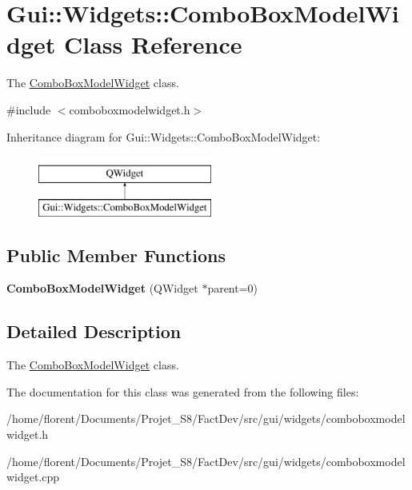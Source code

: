 \hypertarget{classGui_1_1Widgets_1_1ComboBoxModelWidget}{\section{Gui\-:\-:Widgets\-:\-:Combo\-Box\-Model\-Widget Class Reference}
\label{classGui_1_1Widgets_1_1ComboBoxModelWidget}
}


The \hyperlink{classGui_1_1Widgets_1_1ComboBoxModelWidget}{Combo\-Box\-Model\-Widget} class.  




{\ttfamily \#include $<$comboboxmodelwidget.\-h$>$}

Inheritance diagram for Gui\-:\-:Widgets\-:\-:Combo\-Box\-Model\-Widget\-:\begin{figure}[H]
\begin{center}
\leavevmode
\includegraphics[height=2.000000cm]{d2/de0/classGui_1_1Widgets_1_1ComboBoxModelWidget}
\end{center}
\end{figure}
\subsection*{Public Member Functions}
\begin{DoxyCompactItemize}
\item 
\hypertarget{classGui_1_1Widgets_1_1ComboBoxModelWidget_afeca0199adce7d17dc440e8fa546c9e5}{{\bfseries Combo\-Box\-Model\-Widget} (Q\-Widget $\ast$parent=0)}\label{classGui_1_1Widgets_1_1ComboBoxModelWidget_afeca0199adce7d17dc440e8fa546c9e5}

\end{DoxyCompactItemize}


\subsection{Detailed Description}
The \hyperlink{classGui_1_1Widgets_1_1ComboBoxModelWidget}{Combo\-Box\-Model\-Widget} class. 

The documentation for this class was generated from the following files\-:\begin{DoxyCompactItemize}
\item 
/home/florent/\-Documents/\-Projet\-\_\-\-S8/\-Fact\-Dev/src/gui/widgets/comboboxmodelwidget.\-h\item 
/home/florent/\-Documents/\-Projet\-\_\-\-S8/\-Fact\-Dev/src/gui/widgets/comboboxmodelwidget.\-cpp\end{DoxyCompactItemize}
